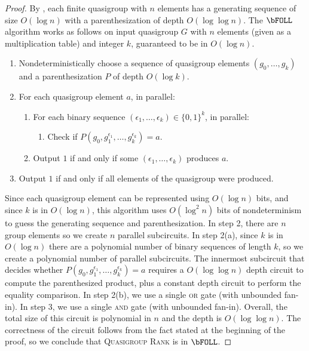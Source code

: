 \documentclass{article}
\begin{document}
\begin{proof}
  By \autocite[Theorem~3.3]{ctw13}, each finite quasigroup with $n$ elements has a generating sequence of size $O(\log n)$ with a parenthesization of depth $O(\log \log n)$.
  The $\bFOLL$ algorithm works as follows on input quasigroup $G$ with $n$ elements (given as a multiplication table) and integer $k$, guaranteed to be in $O(\log n)$.
  \begin{enumerate}
  \item Nondeterministically choose a sequence of quasigroup elements $(g_0, \dotsc, g_k)$ and a parenthesization $P$ of depth $O(\log k)$.
  \item For each quasigroup element $a$, in parallel:
    \begin{enumerate}
    \item For each binary sequence $(\epsilon_1, \dotsc, \epsilon_k) \in \{0, 1\}^k$, in parallel:
      \begin{enumerate}
      \item Check if $P\left(g_0, g_1^{\epsilon_1}, \dotsc, g_k^{\epsilon_k}\right) = a$.
      \end{enumerate}
    \item Output $1$ if and only if some $(\epsilon_1, \dotsc, \epsilon_k)$ produces $a$.
    \end{enumerate}
  \item Output $1$ if and only if all elements of the quasigroup were produced.
  \end{enumerate}
  Since each quasigroup element can be represented using $O(\log n)$ bits, and since $k$ is in $O(\log n)$, this algorithm uses $O(\log^2 n)$ bits of nondeterminism to guess the generating sequence and parenthesization.
  In step 2, there are $n$ group elements so we create $n$ parallel subcircuits.
  In step 2(a), since $k$ is in $O(\log n)$ there are a polynomial number of binary sequences of length $k$, so we create a polynomial number of parallel subcircuits.
  The innermost subcircuit that decides whether $P(g_0, g_1^{\epsilon_1}, \dotsc, g_k^{\epsilon_k}) = a$ requires a $O(\log \log n)$ depth circuit to compute the parenthesized product, plus a constant depth circuit to perform the equality comparison.
  In step 2(b), we use a single \textsc{or} gate (with unbounded fan-in).
  In step 3, we use a single \textsc{and} gate (with unbounded fan-in).
  Overall, the total size of this circuit is polynomial in $n$ and the depth is $O(\log \log n)$.
  The correctness of the circuit follows from the fact stated at the beginning of the proof, so we conclude that \textsc{Quasigroup Rank} is in $\bFOLL$.
\end{proof}
\end{document}
